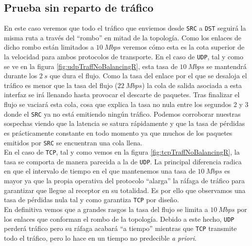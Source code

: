 \documentclass[11pt]{article}
\begin{document}
            \subsection{Prueba sin reparto de tráfico}
                En este caso veremos que todo el tráfico que enviemos desde \texttt{SRC} a \texttt{DST} seguirá la misma ruta a través del ``rombo'' en mitad de la topología. Como los enlaces de dicho rombo están limitados a $10\ Mbps$ veremos cómo esta es la cota superior de la velocidad para ambos protocolos de transporte. En el caso de \texttt{UDP}, tal y como se ve en la figura \ref{fig:udpTraffNoBalancingR}, esta tasa de $10\ Mbps$ se mantendrá durante los $2\ s$ que dura el flujo. Como la tasa del enlace por el que se desaloja el tráfico es menor que la tasa del flujo ($22\ Mbps$) la cola de salida asociada a esta interfaz se irá llenando hasta provocar el descarte de paquetes. Tras finalizar el flujo se vaciará esta cola, cosa que explica la tasa no nula entre los segundos $2$ y $3$ donde el \texttt{SRC} ya no está emitiendo ningún tráfico. Podemos corroborar nuestras sospechas viendo que la latencia se satura rápidamente y que la tasa de pérdidas es prácticamente constante en todo momento ya que muchos de los paquetes emitidos por \texttt{SRC} se encuentran una cola llena.\\

                En el caso de \texttt{TCP}, tal y como vemos en la figura \ref{fig:tcpTraffNoBalancingR}, la tasa se comporta de manera parecida a la de \texttt{UDP}. La principal diferencia radica en que el intervalo de tiempo en el que mantenemos una tasa de $10\ Mbps$ es mayor ya que la propia operativa del protocolo ``alarga'' la ráfaga de tráfico para garantizar que llegue al receptor en su totalidad. Es por ello que observamos una tasa de pérdidas nula tal y como garantiza \texttt{TCP} por diseño.\\

                En definitiva vemos que a grandes rasgos la tasa del flujo se limita a $10\ Mbps$ por los enlaces que conforman el rombo de la topología. Debido a este hecho, \texttt{UDP} perderá tráfico pero su ráfaga acabará ``a tiempo'' mientras que \texttt{TCP} transmite todo el tráfico, pero lo hace en un tiempo no predecible \textit{a priori}.
\end{document}
